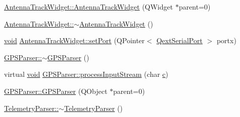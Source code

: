 \begin{DoxyCompactItemize}
\hyperlink{group___antenna_track_gadget_plugin_ga267d3ecf78fda6b906d043097dd0aa45}{Antenna\-Track\-Widget\-::\-Antenna\-Track\-Widget} (Q\-Widget $\ast$parent=0)
\item 
\hyperlink{group___antenna_track_gadget_plugin_gaee8823dccf11047cf563237c1f8e4864}{Antenna\-Track\-Widget\-::$\sim$\-Antenna\-Track\-Widget} ()
\item 
\hyperlink{group___u_a_v_objects_plugin_ga444cf2ff3f0ecbe028adce838d373f5c}{void} \hyperlink{group___antenna_track_gadget_plugin_gafe776706c20e81410397bf737b254c56}{Antenna\-Track\-Widget\-::set\-Port} (Q\-Pointer$<$ \hyperlink{class_qext_serial_port}{Qext\-Serial\-Port} $>$ portx)
\item 
\hyperlink{group___antenna_track_gadget_plugin_ga6773ae49e6fecc274191f0d0e29294d8}{G\-P\-S\-Parser\-::$\sim$\-G\-P\-S\-Parser} ()
\item 
virtual \hyperlink{group___u_a_v_objects_plugin_ga444cf2ff3f0ecbe028adce838d373f5c}{void} \hyperlink{group___antenna_track_gadget_plugin_ga0d2ef23accd7d2cd3e098012f2f8e948}{G\-P\-S\-Parser\-::process\-Input\-Stream} (char \hyperlink{glext_8h_a1f2d7f8147412c43ba2303a56f97ee73}{c})
\item 
\hyperlink{group___antenna_track_gadget_plugin_ga15bb435154bfad7f732bc090c496915e}{G\-P\-S\-Parser\-::\-G\-P\-S\-Parser} (Q\-Object $\ast$parent=0)
\item 
\hyperlink{group___antenna_track_gadget_plugin_ga9a05a4fb6f18cdc568bc4e8f52534977}{Telemetry\-Parser\-::$\sim$\-Telemetry\-Parser} ()
\end{DoxyCompactItemize}

